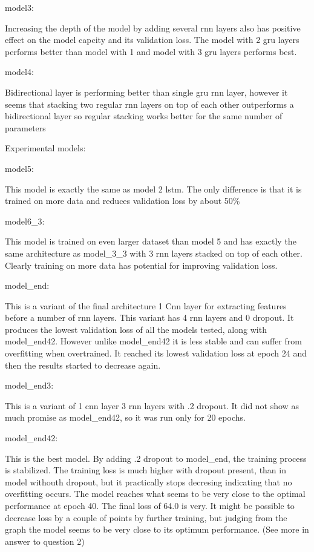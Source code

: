 \documentclass[11pt]{article}
\begin{document}
model3:

Increasing the depth of the model by adding several rnn layers also has
positive effect on the model capcity and its validation loss. The model
with 2 gru layers performs better than model with 1 and model with 3 gru
layers performs best.

model4:

Bidirectional layer is performing better than single gru rnn layer,
however it seems that stacking two regular rnn layers on top of each
other outperforms a bidirectional layer so regular stacking works better
for the same number of parameters

Experimental models:

model5:

This model is exactly the same as model 2 lstm. The only difference is
that it is trained on more data and reduces validation loss by about
50\%

model6\_3:

This model is trained on even larger dataset than model 5 and has
exactly the same architecture as model\_3\_3 with 3 rnn layers stacked
on top of each other. Clearly training on more data has potential for
improving validation loss.

model\_end:

This is a variant of the final architecture 1 Cnn layer for extracting
features before a number of rnn layers. This variant has 4 rnn layers
and 0 dropout. It produces the lowest validation loss of all the models
tested, along with model\_end42. However unlike model\_end42 it is less
stable and can suffer from overfitting when overtrained. It reached its
lowest validation loss at epoch 24 and then the results started to
decrease again.

model\_end3:

This is a variant of 1 cnn layer 3 rnn layers with .2 dropout. It did
not show as much promise as model\_end42, so it was run only for 20
epochs.

model\_end42:

This is the best model. By adding .2 dropout to model\_end, the training
process is stabilized. The training loss is much higher with dropout
present, than in model withouth dropout, but it practically stops
decresing indicating that no overfitting occurs. The model reaches what
seems to be very close to the optimal performance at epoch 40. The final
loss of 64.0 is very. It might be possible to decrease loss by a couple
of points by further training, but judging from the graph the model
seems to be very close to its optimum performance. (See more in answer
to question 2)
\end{document}
